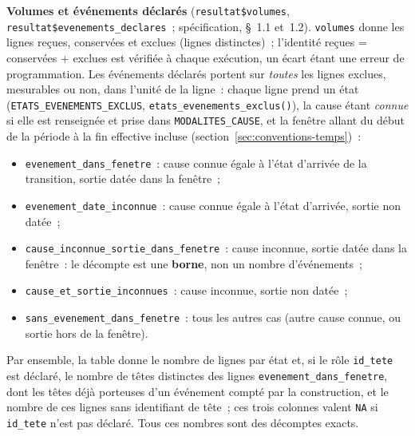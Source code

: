 \documentclass[a4paper,11pt]{article}
\newcommand{\code}[1]{\texttt{\small #1}}
\begin{document}
{\medskip
\textbf{Volumes et événements déclarés} (\code{resultat\$volumes},
\code{resultat\$evenements\_declares}~; spécification, §~1.1 et~1.2).
\code{volumes} donne les lignes reçues, conservées et exclues (lignes
distinctes)~; l'identité reçues = conservées + exclues est vérifiée à chaque
exécution, un écart étant une erreur de programmation. Les événements
déclarés portent sur \emph{toutes} les lignes exclues, mesurables ou non,
dans l'unité de la ligne~: chaque ligne prend un état
(\code{ETATS\_EVENEMENTS\_EXCLUS}, \code{etats\_evenements\_exclus()}), la
cause étant \emph{connue} si elle est renseignée et prise dans
\code{MODALITES\_CAUSE}, et la fenêtre allant du début de la période à la fin
effective incluse (section~\ref{sec:conventions-temps})~:
\begin{itemize}[leftmargin=*, itemsep=2pt]
  \item \code{evenement\_dans\_fenetre}~: cause connue égale à l'état
    d'arrivée de la transition, sortie datée dans la fenêtre~;
  \item \code{evenement\_date\_inconnue}~: cause connue égale à l'état
    d'arrivée, sortie non datée~;
  \item \code{cause\_inconnue\_sortie\_dans\_fenetre}~: cause inconnue, sortie
    datée dans la fenêtre~: le décompte est une \textbf{borne}, non un nombre
    d'événements~;
  \item \code{cause\_et\_sortie\_inconnues}~: cause inconnue, sortie non
    datée~;
  \item \code{sans\_evenement\_dans\_fenetre}~: tous les autres cas (autre
    cause connue, ou sortie hors de la fenêtre).
\end{itemize}
Par ensemble, la table donne le nombre de lignes par état et, si le rôle
\code{id\_tete} est déclaré, le nombre de têtes distinctes des lignes
\code{evenement\_dans\_fenetre}, dont les têtes déjà porteuses d'un
événement compté par la construction, et le nombre de ces lignes sans
identifiant de tête~; ces trois colonnes valent \code{NA} si \code{id\_tete}
n'est pas déclaré. Tous ces nombres sont des décomptes exacts.

}
\end{document}

